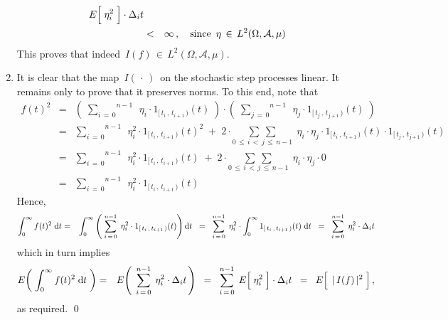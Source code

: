 \begin{enumerate}
\begin{eqnarray*}
		E\!\left[\; \overset{{\color{white}.}}{\eta_{i}^{2}} \;\right] \cdot \Delta_{i}t
	\\
	& < &
		\infty\,,
		\quad\textnormal{since \,$\eta \,\in\, L^2(\Omega,\mathcal{A},\mu)$}
	\end{eqnarray*}
	This proves that indeed \,$I(f) \,\in\, L^{2}(\Omega,\mathcal{A},\mu)$.
\item
	It is clear that the map \,$I(\,\cdot\,)$\, on the stochastic step processes linear.
	It remains only to prove that it preserves norms.
	To this end, note that
	\begin{eqnarray*}
	f(t)^{2}
	& = &
		\left(\;
			\overset{n-1}{\underset{i\,=\,0}{\sum}}\;\,
			\eta_{i} \cdot 1_{[\,t_{i}\,,\,t_{i+1}\,)}(t)
			\;\right)
		\cdot
		\left(\;
			\overset{n-1}{\underset{j\,=\,0}{\sum}}\;\,
			\eta_{j} \cdot 1_{[\,t_{j}\,,\,t_{j+1}\,)}(t)
			\;\right)
	\\
	& = &
		\overset{n-1}{\underset{i\,=\,0}{\sum}}\;\,
		\eta_{i}^{2} \cdot 1_{[\,t_{i}\,,\,t_{i+1}\,)}(t)^{2}
		\; + \;
		2 \cdot
		\underset{0\,\leq\,i\,<\,j\,\leq\,n-1}{\sum\;\sum}\;\,
		\eta_{i} \cdot \eta_{j}
		\cdot
		1_{[\,t_{i}\,,\,t_{i+1}\,)}(t)
		\cdot
		1_{[\,t_{j}\,,\,t_{j+1}\,)}(t)
	\\
	& = &
		\overset{n-1}{\underset{i\,=\,0}{\sum}}\;\,
		\eta_{i}^{2} \cdot 1_{[\,t_{i}\,,\,t_{i+1}\,)}(t)
		\; + \;
		2 \cdot
		\underset{0\,\leq\,i\,<\,j\,\leq\,n-1}{\sum\;\sum}\;\,
		\eta_{i} \cdot \eta_{j}
		\cdot
		0
	\\
	& = &
		\overset{n-1}{\underset{i\,=\,0}{\sum}}\;\,
		\eta_{i}^{2} \cdot 1_{[\,t_{i}\,,\,t_{i+1}\,)}(t)
	\end{eqnarray*}
	Hence,
	\begin{eqnarray*}
	\int_{0}^{\infty} f(t)^{2} \;\textnormal{d} t
	& = &
		\int_{0}^{\infty}
			\left(\;
				\overset{n-1}{\underset{i\,=\,0}{\sum}}\;\,
				\eta_{i}^{2} \cdot 1_{[\,t_{i}\,,\,t_{i+1}\,)}(t)
				\right)
		 	\textnormal{d} t
	\;\; = \;\;
		\overset{n-1}{\underset{i\,=\,0}{\sum}}\;\,
		\eta_{i}^{2} \cdot
		\int_{0}^{\infty} 1_{[\,t_{i}\,,\,t_{i+1}\,)}(t) \;\textnormal{d} t
	\;\; = \;\;
		\overset{n-1}{\underset{i\,=\,0}{\sum}}\;\,
		\eta_{i}^{2} \cdot \Delta_{i}t
	\end{eqnarray*}
	which in turn implies
	\begin{eqnarray*}
	E\!\left(\; \int_{0}^{\infty} f(t)^{2} \;\d t \;\right)
	& = &
		E\!\left(\;\,
			\overset{n-1}{\underset{i\,=\,0}{\sum}}\;\,
			\eta_{i}^{2} \cdot \Delta_{i}t
			\,\right)
	\;\; = \;\;
		\overset{n-1}{\underset{i\,=\,0}{\sum}}\;\,
		E\!\left[\; \overset{{\color{white}.}}{\eta_{i}^{2}} \;\right] \cdot \Delta_{i}t
	\;\; = \;\;
		E\!\left[\;\, \overset{{\color{white}.}}{\vert\, I(f) \,\vert^{2}} \;\right],
	\end{eqnarray*}
	as required.
	\qed
\end{enumerate}

